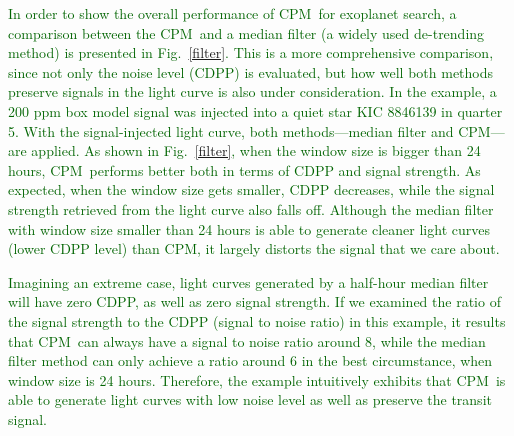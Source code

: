 \documentclass[12pt, preprint]{aastex}
\newcommand{\name}{CPM}
\newcommand{\revise}[1]{\textcolor{darkgreen}{#1}}
\begin{document}
\revise{In order to show the overall performance of \name\ for exoplanet search, a comparison between the \name\ and a median filter (a widely used de-trending method) is presented in Fig.~\ref{filter}. This is a more comprehensive comparison, since not only the noise level (CDPP) is evaluated,  but how well both methods preserve signals in the light curve is also under consideration. In the example, a 200 ppm box model signal was injected into a quiet star KIC 8846139 in quarter 5. With the signal-injected light curve,  both methods---median filter and \name---are applied. As shown in Fig.~\ref{filter}, when  the window size is bigger than 24 hours, \name\ performs better both in terms of CDPP and signal strength. As expected, when the window size gets smaller, CDPP decreases,  while the signal strength retrieved from the light curve also falls off. Although the median filter with window size smaller than 24 hours is able to generate cleaner light curves (lower CDPP level) than \name, it largely distorts the signal that we care about.}

\revise{Imagining an extreme case, light curves generated by a half-hour median filter will have zero CDPP, as well as zero signal strength. If we examined the ratio of the signal strength to the CDPP (signal to noise ratio) in this example, it results that \name\ can always have a signal to noise ratio around 8, while the median filter method can only achieve a ratio around 6 in the best circumstance, when window size is 24 hours. Therefore, the example intuitively exhibits that \name\ is able to generate light curves with low noise level as well as preserve the transit signal.}
\end{document}

